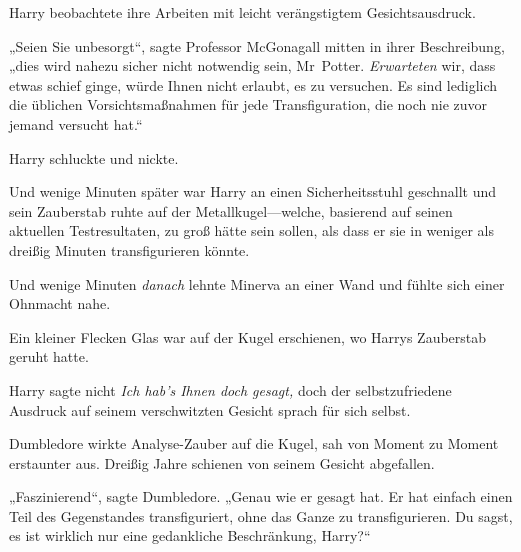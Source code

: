 Harry beobachtete ihre Arbeiten mit leicht verängstigtem Gesichtsausdruck.

„Seien Sie unbesorgt“, sagte Professor McGonagall mitten in ihrer Beschreibung, „dies wird nahezu sicher nicht notwendig sein, Mr~Potter. \emph{Erwarteten} wir, dass etwas schief ginge, würde Ihnen nicht erlaubt, es zu versuchen. Es sind lediglich die üblichen Vorsichtsmaßnahmen für jede Transfiguration, die noch nie zuvor jemand versucht hat.“

Harry schluckte und nickte.

Und wenige Minuten später war Harry an einen Sicherheitsstuhl geschnallt und sein Zauberstab ruhte auf der Metallkugel—welche, basierend auf seinen aktuellen Testresultaten, zu groß hätte sein sollen, als dass er sie in weniger als dreißig Minuten transfigurieren könnte.

Und wenige Minuten \emph{danach} lehnte Minerva an einer Wand und fühlte sich einer Ohnmacht nahe.

Ein kleiner Flecken Glas war auf der Kugel erschienen, wo Harrys Zauberstab geruht hatte.

Harry sagte nicht \emph{Ich hab’s Ihnen doch gesagt,} doch der selbstzufriedene Ausdruck auf seinem verschwitzten Gesicht sprach für sich selbst.

Dumbledore wirkte Analyse-Zauber auf die Kugel, sah von Moment zu Moment erstaunter aus. Dreißig Jahre schienen von seinem Gesicht abgefallen.

„Faszinierend“, sagte Dumbledore. „Genau wie er gesagt hat. Er hat einfach einen Teil des Gegenstandes transfiguriert, ohne das Ganze zu transfigurieren. Du sagst, es ist wirklich nur eine gedankliche Beschränkung, Harry?“

